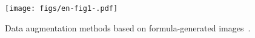 
\begin{figure}[t]
    \centering
    \texttt{[image: figs/en-fig1-.pdf]}
    \vspace{-12pt}
    \caption{Data augmentation methods based on formula-generated images~\cite{ImageNet-C,PIXMIX}.}
    \label{fig:figPIXMIXmoireConcept}
    \vspace{-12pt}
\end{figure}



